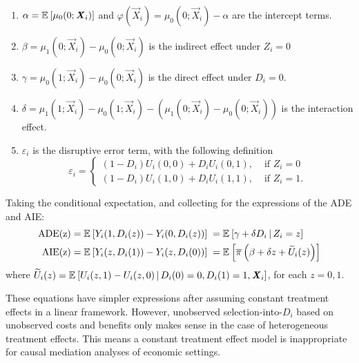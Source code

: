 \begin{enumerate}[label=\textbf{(\alph*)}]
    \item $\alpha = \mathbb{E}_{} \left[ \mu_0(0; \boldsymbol{\mathit{X}}_i) \right]$ and $\varphi(\vec X_i) = \mu_0(0; \vec X_i) - \alpha$ are the intercept terms.
    \item $\beta = \mu_1(0; \vec X_i) - \mu_0(0; \vec X_i)$ is the indirect effect under $Z_i = 0$
    \item $\gamma = \mu_0(1; \vec X_i) - \mu_0(0; \vec X_i)$ is the direct effect under $D_i = 0$.
    \item $\delta = \mu_1(1; \vec X_i) - \mu_0(1; \vec X_i)- \left( \mu_1(0; \vec X_i) - \mu_0(0; \vec X_i) \right)$ is the interaction effect.
    \item $\varepsilon_i$ is the disruptive error term, with the following definition
    \[ \varepsilon_i = \begin{cases}
        \left(1 - D_i \right) U_i(0,0) + D_i U_i(0,1),& \text{ if } Z_i = 0 \\
        \left(1 - D_i \right) U_i(1,0) + D_i U_i(1,1),& \text{ if } Z_i = 1.
    \end{cases} \]
\end{enumerate}

Taking the conditional expectation, and collecting for the expressions of the ADE and AIE:
\begin{align*}
    \text{ADE(z)}
        &= \mathbb{E}_{} \left[ Y_i(1, D_i(z)) - Y_i(0, D_i(z)) \right]
        \;= \mathbb{E}_{} \left[ \gamma + \delta D_i \, \middle\vert \, Z_i = z \right] \\
    \text{AIE(z)}
        &=\mathbb{E}_{} \left[ Y_i(z, D_i(1)) - Y_i(z, D_i(0)) \right]
        \;= \mathbb{E}_{} \left[ \overline{\pi} \left( \beta + \delta z + \widetilde{U}_i(z) \right) \right]
\end{align*}
where $\widetilde{U}_i(z) = \mathbb{E}_{} \left[  U_i(z, 1) - U_i(z, 0) \, \middle\vert \, D_i(0)=0, D_i(1)=1, \boldsymbol{\mathit{X}}_i \right]$, for each $z=0,1$.

These equations have simpler expressions after assuming constant treatment effects in a linear framework.
However, unobserved selection-into-$D_i$ based on unobserved costs and benefits only makes sense in the case of heterogeneous treatment effects.
This means a constant treatment effect model is inappropriate for causal mediation analyses of economic settings.

